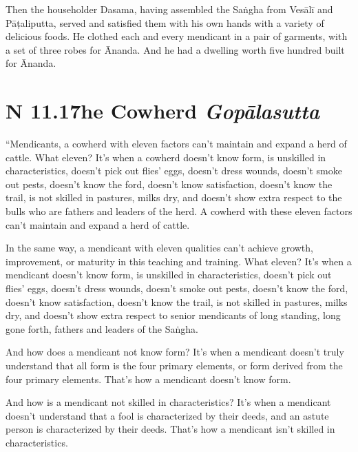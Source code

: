 \documentclass[12pt,openany]{book}%
\newcommand*{\suttatitleacronym}[1]{\smaller[2]{#1}\vspace*{.3em}}
\newcommand*{\suttatitletranslation}[1]{\linebreak{#1}}
\newcommand*{\suttatitleroot}[1]{\linebreak\smaller[2]\itshape{#1}}
\newcommand*{\tocacronym}[1]{\hspace*{-3.3em}{#1}\quad}
\newcommand*{\toctranslation}[1]{#1}
\newcommand*{\tocroot}[1]{(\textit{#1})}
\begin{document}
Then the householder Dasama, having assembled the \textsanskrit{Saṅgha} from \textsanskrit{Vesālī} and \textsanskrit{Pāṭaliputta}, served and satisfied them with his own hands with a variety of delicious foods. He clothed each and every mendicant in a pair of garments, with a set of three robes for Ānanda. And he had a dwelling worth five hundred built for Ānanda. 

%
\section*{{\suttatitleacronym AN 11.17}{\suttatitletranslation The Cowherd }{\suttatitleroot Gopālasutta}}
\addcontentsline{toc}{section}{\tocacronym{AN 11.17} \toctranslation{The Cowherd } \tocroot{Gopālasutta}}

“Mendicants, a cowherd with eleven factors can’t maintain and expand a herd of cattle. What eleven? It’s when a cowherd doesn’t know form, is unskilled in characteristics, doesn’t pick out flies’ eggs, doesn’t dress wounds, doesn’t smoke out pests, doesn’t know the ford, doesn’t know satisfaction, doesn’t know the trail, is not skilled in pastures, milks dry, and doesn’t show extra respect to the bulls who are fathers and leaders of the herd. A cowherd with these eleven factors can’t maintain and expand a herd of cattle. 

In the same way, a mendicant with eleven qualities can’t achieve growth, improvement, or maturity in this teaching and training. What eleven? It’s when a mendicant doesn’t know form, is unskilled in characteristics, doesn’t pick out flies’ eggs, doesn’t dress wounds, doesn’t smoke out pests, doesn’t know the ford, doesn’t know satisfaction, doesn’t know the trail, is not skilled in pastures, milks dry, and doesn’t show extra respect to senior mendicants of long standing, long gone forth, fathers and leaders of the \textsanskrit{Saṅgha}. 

And how does a mendicant not know form? It’s when a mendicant doesn’t truly understand that all form is the four primary elements, or form derived from the four primary elements. That’s how a mendicant doesn’t know form. 

And how is a mendicant not skilled in characteristics? It’s when a mendicant doesn’t understand that a fool is characterized by their deeds, and an astute person is characterized by their deeds. That’s how a mendicant isn’t skilled in characteristics. 
\end{document}
